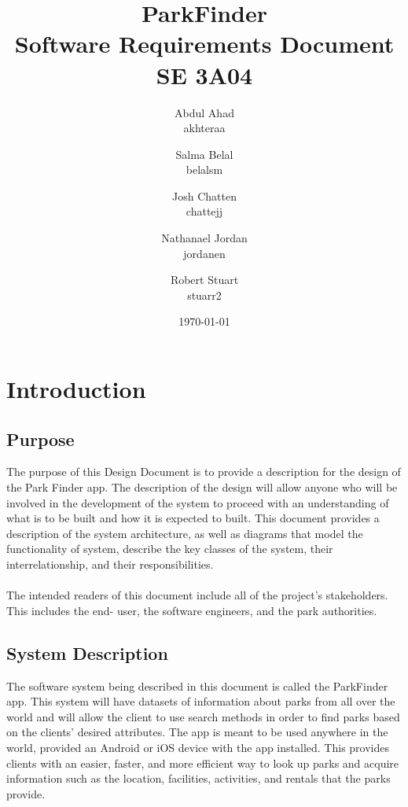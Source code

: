 \documentclass[titlepage]{article}
\title{ParkFinder\\Software Requirements Document\\SE 3A04}
\author{Abdul Ahad \\ akhteraa \and Salma Belal \\ belalsm \and Josh Chatten \\ chattejj \and
Nathanael Jordan \\ jordanen \and Robert Stuart \\ stuarr2}
\date{\today}
\begin{document}
\maketitle	
\thispagestyle{empty}
\clearpage
\setcounter{tocdepth}{2}%
\tableofcontents
\clearpage


\section{Introduction}
\label{sec:introduction}


\subsection{Purpose}
\label{sub:purpose}


 The purpose of this Design Document is to provide a description for the design of the Park Finder app. The description of the design will allow anyone who will be involved in the development of the system to proceed with an understanding of what is to be built and how it is expected to built. This document provides a description of the system architecture, as well as diagrams that model the functionality of system, describe the key classes of the system, their interrelationship, and their responsibilities.\\
 \\
 The intended readers of this document include all of the project's stakeholders. This includes the end-
 user, the software engineers, and the park authorities.



\subsection{System Description}
\label{sub:system_description}

The software system being described in this document is called the ParkFinder app. This system will have datasets of information about parks from all over the world and will allow the client to use search methods in order to find parks based on the clients' desired attributes. The app is meant to be used anywhere in the world, provided an Android or iOS device with the app installed. This provides clients with an easier, faster, and more efficient way to look up parks and acquire information such as the location, facilities, activities, and rentals that the parks provide.
\end{document}

